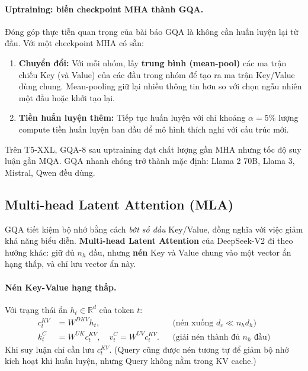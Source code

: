 \paragraph{Uptraining: biến checkpoint MHA thành GQA.} Đóng góp thực tiễn quan trọng của bài báo GQA là không cần huấn luyện lại từ đầu. Với một checkpoint MHA có sẵn:
\begin{enumerate}
	\item \textbf{Chuyển đổi:} Với mỗi nhóm, lấy \textbf{trung bình (mean-pool)} các ma trận chiếu Key (và Value) của các đầu trong nhóm để tạo ra ma trận Key/Value dùng chung. Mean-pooling giữ lại nhiều thông tin hơn so với chọn ngẫu nhiên một đầu hoặc khởi tạo lại.
	\item \textbf{Tiền huấn luyện thêm:} Tiếp tục huấn luyện với chỉ khoảng $\alpha = 5\%$ lượng compute tiền huấn luyện ban đầu để mô hình thích nghi với cấu trúc mới.
\end{enumerate}
Trên T5-XXL, GQA-8 sau uptraining đạt chất lượng gần MHA nhưng tốc độ suy luận gần MQA. GQA nhanh chóng trở thành mặc định: Llama 2 70B, Llama 3, Mistral, Qwen đều dùng.

\subsection{Multi-head Latent Attention (MLA)}
\label{ssec:mla}

GQA tiết kiệm bộ nhớ bằng cách \emph{bớt số đầu} Key/Value, đồng nghĩa với việc giảm khả năng biểu diễn. \textbf{Multi-head Latent Attention} của DeepSeek-V2 \cite{deepseekai2024v2} đi theo hướng khác: giữ đủ $n_h$ đầu, nhưng \textbf{nén} Key và Value chung vào một vector ẩn hạng thấp, và chỉ lưu vector ẩn này.

\paragraph{Nén Key-Value hạng thấp.} Với trạng thái ẩn $h_t \in \mathbb{R}^{d}$ của token $t$:
\begin{align*}
c_t^{KV} &= W^{DKV} h_t, &&\text{(nén xuống } d_c \ll n_h d_h\text{)}\\
k_t^{C} &= W^{UK} c_t^{KV}, \quad v_t^{C} = W^{UV} c_t^{KV}. &&\text{(giải nén thành đủ } n_h \text{ đầu)}
\end{align*}
Khi suy luận chỉ cần lưu $c_t^{KV}$. (Query cũng được nén tương tự để giảm bộ nhớ kích hoạt khi huấn luyện, nhưng Query không nằm trong KV cache.)

